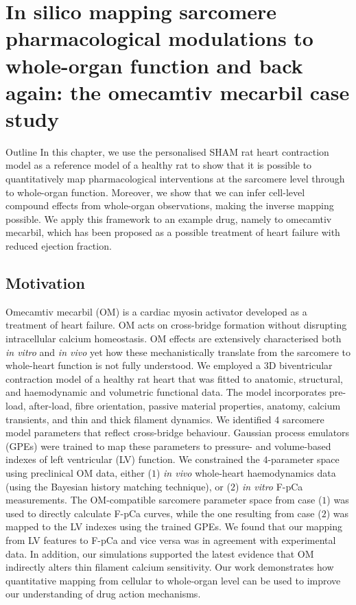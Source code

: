 \chapter{In silico mapping sarcomere pharmacological modulations to whole-organ function and back again: the omecamtiv mecarbil case study}\label{cha:chapter5}
%
%
%
\begin{remark}{Outline}
    In this chapter, we use the personalised SHAM rat heart contraction model as a reference model of a healthy rat to show that it is possible to quantitatively map pharmacological interventions at the sarcomere level through to whole-organ function. Moreover, we show that we can infer cell-level compound effects from whole-organ observations, making the inverse mapping possible. We apply this framework to an example drug, namely to omecamtiv mecarbil, which has been proposed as a possible treatment of heart failure with reduced ejection fraction.
\end{remark}


%
%
%
\section{Motivation}\label{sec:ch5motivation}

\noindent
Omecamtiv mecarbil (OM) is a cardiac myosin activator developed as a treatment of heart failure. OM acts on cross-bridge formation without disrupting intracellular calcium homeostasis. OM effects are extensively characterised both \textit{in vitro} and \textit{in vivo} yet how these mechanistically translate from the sarcomere to whole-heart function is not fully understood. We employed a $3$D biventricular contraction model of a healthy rat heart that was fitted to anatomic, structural, and haemodynamic and volumetric functional data. The model incorporates pre-load, after-load, fibre orientation, passive material properties, anatomy, calcium transients, and thin and thick filament dynamics. We identified $4$ sarcomere model parameters that reflect cross-bridge behaviour. Gaussian process emulators (GPEs) were trained to map these parameters to pressure- and volume-based indexes of left ventricular (LV) function. We constrained the $4$-parameter space using preclinical OM data, either ($1$) \textit{in vivo} whole-heart haemodynamics data (using the Bayesian history matching technique), or ($2$) \textit{in vitro} F-pCa measurements. The OM-compatible sarcomere parameter space from case ($1$) was used to directly calculate F-pCa curves, while the one resulting from case ($2$) was mapped to the LV indexes using the trained GPEs. We found that our mapping from LV features to F-pCa and vice versa was in agreement with experimental data. In addition, our simulations supported the latest evidence that OM indirectly alters thin filament calcium sensitivity. Our work demonstrates how quantitative mapping from cellular to whole-organ level can be used to improve our understanding of drug action mechanisms.

